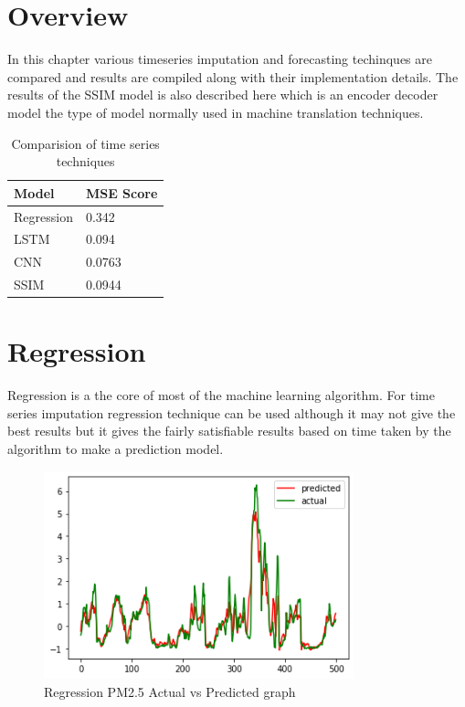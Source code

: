 
\section{Overview}
In this chapter various timeseries imputation and forecasting techinques are compared and results are compiled along with their implementation details. The results of the SSIM model is also described here which is an encoder decoder model the type of model normally used in machine translation techniques.

\begin{table}[h]
	\centering
	\begin{tabular}[widht=\textwidth]{|l | l |}
	\hline
	Model & MSE Score\\
	\hline
	Regression & 0.342\\
	\hline
	LSTM & 0.094\\
	\hline
	CNN & 0.0763\\
	\hline
	SSIM & 0.0944\\
	\hline
	\end{tabular}
	\caption{Comparision of time series techniques}
	\label{tab:technique-comparision-table}
\end{table}

\section{Regression}
Regression is a the core of most of the machine learning algorithm. For time series imputation regression technique can be used although it may not give the best results but it gives the fairly satisfiable results based on time taken by the algorithm to make a prediction model.

\begin{figure}[ht]
	\centering
	\includegraphics[width=0.8\textwidth]{images/techniques/regression.png}
	\caption{Regression PM2.5 Actual vs Predicted graph}
	\label{fig:regression-tech}
\end{figure}

